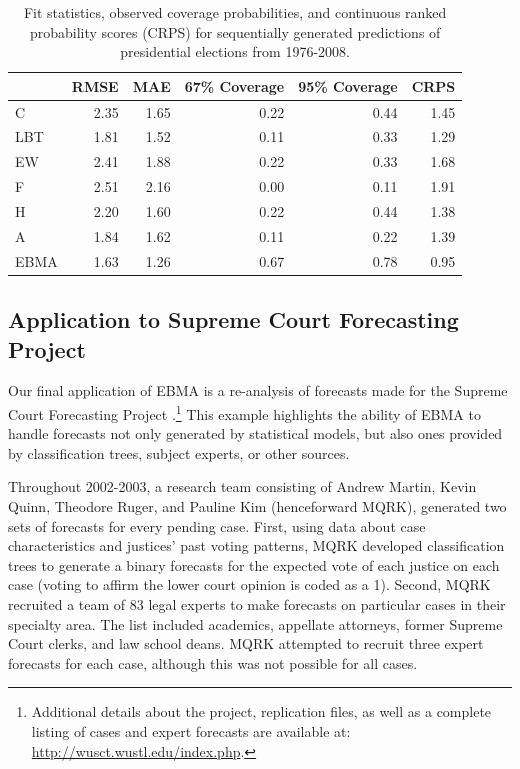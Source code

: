 \documentclass[pdftex,12pt,fullpage,oneside]{amsart}
\begin{document}
\begin{table}[ht!]
  \caption{\footnotesize Fit statistics, observed coverage
    probabilities, and continuous ranked probability scores (CRPS) for
    sequentially generated predictions of presidential elections from 1976-2008.}
\label{Pres-Res}
\begin{tabular}{l|rrrrr}
\hline
	&	RMSE	&	MAE	&	67\% Coverage	&
        95\% Coverage	&	CRPS	\\
\hline
C 	&	2.35	&	1.65	&	0.22	&	0.44	&	1.45	\\
LBT	&	1.81	&	1.52	&	0.11	&	0.33	&	1.29	\\
EW	&	2.41	&	1.88	&	0.22	&	0.33	&	1.68	\\
F	&	2.51	&	2.16	&	0.00	&	0.11	&	1.91	\\
H	&	2.20	&	1.60	&	0.22	&	0.44	&	1.38	\\
A	&	1.84	&	1.62	&	0.11	&	0.22	&	1.39	\\
EBMA	&	1.63	&	1.26	&	0.67	&	0.78
&	0.95	\\
\hline
\end{tabular}
\end{table}



\subsection{Application to Supreme Court Forecasting Project}

Our final application of EBMA is a re-analysis of forecasts made for
the Supreme Court Forecasting Project \citep{Ruger:2004,
  Martin:2004}.\footnote{Additional details about the project,
  replication files, as well as a complete listing of cases and expert
  forecasts are available at: \url{http://wusct.wustl.edu/index.php}.}
This example highlights the ability of EBMA to handle forecasts not
only generated by statistical models, but also ones provided by
classification trees, subject experts, or other sources.


Throughout 2002-2003, a research team consisting of Andrew
Martin, Kevin Quinn, Theodore Ruger, and Pauline Kim (henceforward
MQRK), generated two sets of forecasts for every pending case.  First,
using data about case characteristics and justices' past voting
patterns, MQRK developed classification trees to generate a binary
forecasts for the expected vote of each justice on each case (voting
to affirm the lower court opinion is coded as a 1).  Second, MQRK
recruited a team of 83 legal experts to make forecasts on particular
cases in their specialty area.  The list included academics, appellate
attorneys, former Supreme Court clerks, and law school deans.  MQRK
attempted to recruit three expert forecasts for each case, although
this was not possible for all cases.
\end{document}
